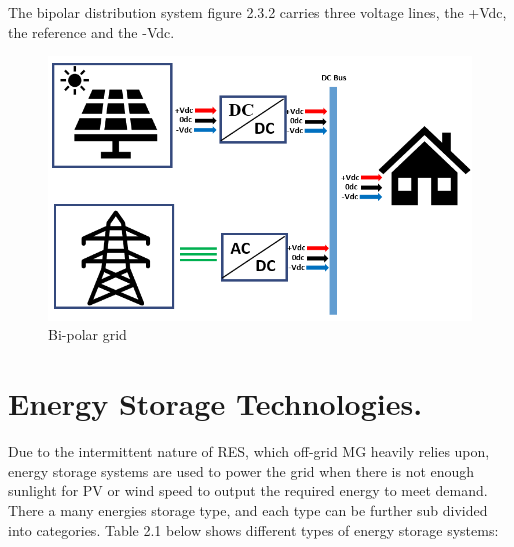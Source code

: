 The bipolar distribution system figure 2.3.2 carries three voltage lines, the +Vdc, the reference and the -Vdc.
\begin{figure}[H]
	\centering
	\includegraphics[totalheight=6cm]{Figures/bipolar grid.png}
	\caption{Bi-polar grid}
\end{figure}

\section{Energy Storage Technologies.}
Due to the intermittent nature of RES, which off-grid MG heavily relies upon, energy storage systems are used to power the grid when there is not enough sunlight for PV or wind speed to output the required energy to meet demand. 
There a many energies storage type, and each type can be further sub divided into categories. Table 2.1 below shows different types of energy storage systems:


